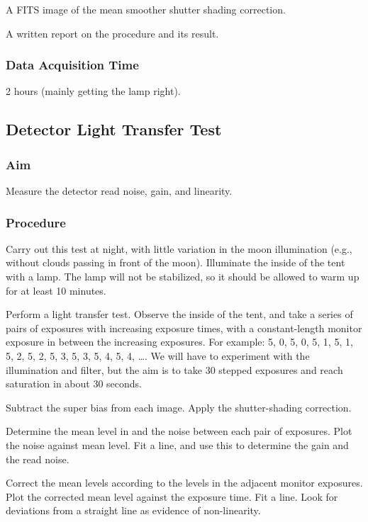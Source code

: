 \documentclass{article}
\begin{document}
A FITS image of the mean smoother shutter shading correction.

A written report on the procedure and its result.

\subsubsection{Data Acquisition Time}

2 hours (mainly getting the lamp right).


\subsection{Detector Light Transfer Test}

\subsubsection{Aim}

Measure the detector read noise, gain, and linearity.

\subsubsection{Procedure}

Carry out this test at night, with little variation in the moon illumination (e.g., without clouds passing in front of the moon). Illuminate the inside of the tent with a lamp. The lamp will not be stabilized, so it should be allowed to warm up for at least 10 minutes.

Perform a light transfer test. Observe the inside of the tent, and take a series of pairs of exposures with increasing exposure times, with a constant-length monitor exposure in between the increasing exposures. For example: 5, 0, 5, 0, 5, 1, 5, 1, 5, 2, 5, 2, 5, 3, 5, 3, 5, 4, 5, 4, \ldots. We will have to experiment with the illumination and filter, but the aim is to take 30 stepped exposures and reach saturation in about 30 seconds.

Subtract the super bias from each image. Apply the shutter-shading correction.

Determine the mean level in and the noise between each pair of exposures. Plot the noise against mean level. Fit a line, and use this to determine the gain and the read noise.

Correct the mean levels according to the levels in the adjacent monitor exposures. Plot the corrected mean level against the exposure time. Fit a line. Look for deviations from a straight line as evidence of non-linearity.
\end{document}
